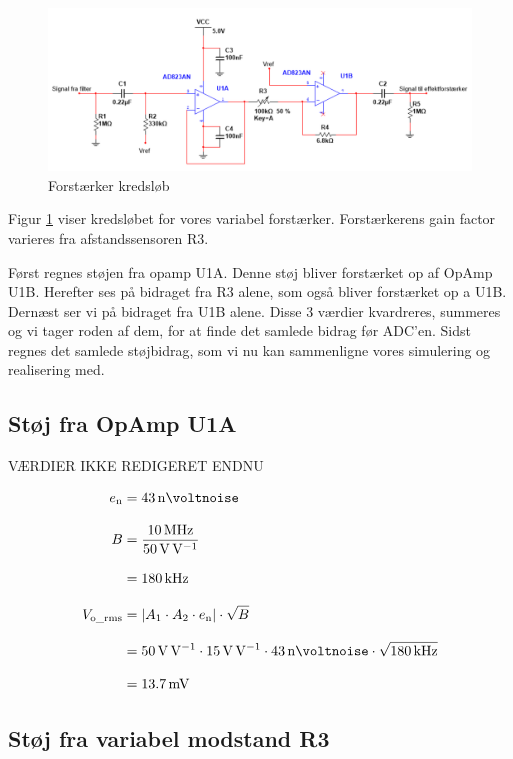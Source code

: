 \documentclass[a4paper, 11pt, article,oneside,openany]{memoir} %
\newcommand{\tsub}[1]{_{\textup{#1}}}
\begin{document}
\begin{figure}[ht] %
	\centering
	\includegraphics[width=\textwidth]{figure/kreds1}
	\caption{Forstærker kredsløb}
	\label{fig:kreds1}
\end{figure}
Figur \ref{fig:kreds1} viser kredsløbet for vores variabel forstærker. Forstærkerens gain factor varieres fra afstandssensoren R3.

Først regnes støjen fra opamp U1A. Denne støj bliver forstærket op af OpAmp U1B. Herefter ses på bidraget fra R3 alene, som også bliver forstærket op a U1B. Dernæst ser vi på bidraget fra U1B alene. Disse 3 værdier kvardreres, summeres og vi tager roden af dem, for at finde det samlede bidrag før ADC'en. Sidst regnes det samlede støjbidrag, som vi nu kan sammenligne vores simulering og realisering med.

\subsection{Støj fra OpAmp U1A}


VÆRDIER IKKE REDIGERET ENDNU

\begin{align*}
e\tsub{n} &= \SI{43}{\nano\voltnoise}
\\[2.0ex]
B &= \frac{ \SI{10}{\mega\hertz}}{\SI{50}{\volt\per\volt}}
\\[2.0ex]
&= \SI{180}{\kilo\hertz}
\\[2.0ex]
V\tsub{o\_rms} &= \left| A_1\cdot A_2 \cdot e\tsub{n} \right| \cdot \sqrt{B}
\\[2.0ex]
&= \SI{50}{\volt\per\volt} \cdot \SI{15}{\volt\per\volt} \cdot \SI{43}{\nano\voltnoise} \cdot \sqrt{\SI{180}{\kilo\hertz}}
\\[2.0ex]
&= \SI{13.7}{\milli\volt}
\end{align*}


\subsection{Støj fra variabel modstand R3}
\end{document}
